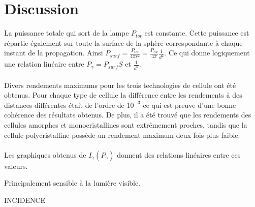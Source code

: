 \section{Discussion}

La puissance totale qui sort de la lampe \(P_{tot}\) est constante. Cette puissance est répartie également sur toute la surface de la sphère correspondante à chaque instant de la propagation. Ainsi \(P_{surf} = \frac{P_{tot}}{4 \pi r^2} = \frac{P_{tot}}{4 \pi} \frac{1}{d^2} \). Ce qui donne logiquement une relation linéaire entre \(P_\gamma = P_{surf} S\) et \(\frac{1}{d^2}\).

\paragraph{}
Divers rendements maximums pour les trois technologies de cellule ont été obtenus. Pour chaque type de cellule la différence entre les rendements à des distances différentes était de l'ordre de \(10^{-3}\) ce qui est preuve d'une bonne cohérence des résultats obtenus. De plus, il a été trouvé que les rendements des cellules amorphes et monocristallines sont extrêmement proches, tandis que la cellule polycristalline possède un rendement maximum deux fois plus faible.

\paragraph{}
Les graphiques obtenus de \(I_\gamma (P_\gamma)\) donnent des relations linéaires entre ces valeurs.




Principalement sensible à la lumière visible.


INCIDENCE


